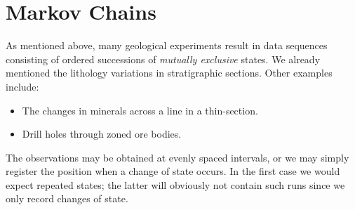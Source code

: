 \section{Markov Chains}

As mentioned above, many geological experiments result in data sequences consisting of 
ordered successions of \emph{mutually exclusive} states.  We already mentioned the lithology variations 
in stratigraphic sections.  Other examples include:
\begin{itemize}
\item	The changes in minerals across a line in a thin-section.
\item	Drill holes through zoned ore bodies.
\end{itemize}
The observations may be obtained at evenly spaced intervals, or we may simply register the 
position when a change of state occurs.  In the first case we would expect repeated states; the 
latter will obviously not contain such runs since we only record changes of state. 

